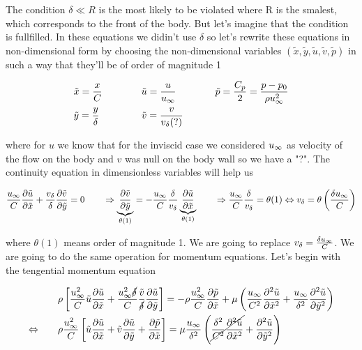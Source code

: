 	The condition $\delta \ll R$ is the most likely to be violated where R is the smalest, which corresponds to the front of the body. But let's imagine that the condition is fullfilled. In these equations we didin't use $\delta$ so let's rewrite these equations in non-dimensional form by choosing the non-dimensional variables $(\tilde{x}, \tilde{y}, \tilde{u}, \tilde{v}, \tilde{p})$ in such a way that they'll be of order of magnitude 1
	
	\begin{equation}
	\begin{aligned}
		&\tilde{x} = \frac{x}{C} \qquad\qquad  \tilde{u} = \frac{u}{\uinf} \qquad\qquad  \tilde{p} = \frac{C_p}{2} = \frac{p-p_0}{\rho\uinf ^2}\\
		&\tilde{y} = \frac{y}{\delta} \qquad \qquad \ \tilde{v} = \frac{v}{v_\delta (?)} 
	\end{aligned}
	\end{equation}
	
	where for $u$ we know that for the inviscid case we considered $\uinf$ as velocity of the flow on the body and $v$ was null on the body wall so we have a "?". The continuity equation in dimensionless variables will help us 
	
	\begin{equation}
		\frac{\uinf}{C}\frac{\D \tilde{u}}{\D \tilde{x}} + \frac{v_\delta}{\delta}\frac{\D \tilde{v}}{\D \tilde{y}} = 0 \qquad \Rightarrow \underbrace{\frac{\D \tilde{v}}{\D \tilde{y}}}_{\theta (1)} = - \frac{\uinf}{C} \frac{\delta}{v_\delta} \underbrace{\frac{\D \tilde{u}}{\D \tilde{x}}}_{\theta (1)} \qquad \Rightarrow \frac{\uinf}{C} \frac{\delta}{v_\delta} = \theta (1) \Leftrightarrow v_\delta = \theta \left( \frac{\delta \uinf}{C}\right)
	\end{equation}	 
	
	where $\theta (1)$ means order of magnitude 1. We are going to replace $v_\delta = \frac{\delta \uinf}{C}$. We are going to do the same operation for momentum equations. Let's begin with the tengential momentum equation
	
	\begin{equation}
	\begin{aligned}
		&\rho \left[ \frac{\uinf ^2}{C}\tilde{u} \frac{\D \tilde{u}}{\D \tilde{x}} + \frac{\uinf ^2 \cancel{\delta}}{C} \frac{\tilde{v}}{\cancel{\delta}}\frac{\D \tilde{u}}{\D \tilde{y}} \right] = -\rho \frac{\uinf ^2}{C} \frac{\D \tilde{p}}{\D \tilde{x}} + \mu \left( \frac{\uinf}{C^2}\frac{\D ^2 \tilde{u}}{\D \tilde{x}^2} + \frac{\uinf}{\delta ^2}\frac{\D ^2 \tilde{u}}{\D \tilde{y}^2} \right) \\
		\Leftrightarrow \qquad &\rho \frac{\uinf ^2}{C}\left[ \tilde{u} \frac{\D \tilde{u}}{\D \tilde{x}} +  \tilde{v} \frac{\D \tilde{u}}{\D \tilde{y}} + \frac{\D \tilde{p}}{\D \tilde{x}}  \right] =  \mu \frac{\uinf}{\delta ^2} \left( \cancel{\frac{\delta ^2}{C^2}\frac{\D ^2 \tilde{u}}{\D \tilde{x}^2}}+ \frac{\D ^2 \tilde{u}}{\D \tilde{y}^2} \right) \\
	\end{aligned}
	\end{equation}
	
